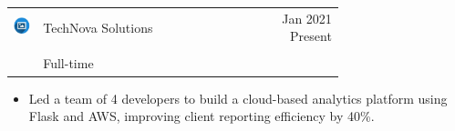 \documentclass{article}
\begin{document}
\begin{paracol}{2}
\colorbox{maincolor}{%
  \begin{minipage}{\linewidth}
    \begin{tabular}{@{}lp{0.72\linewidth}r}
      \begin{minipage}{0.05\linewidth}
        \includegraphics[width=\linewidth]{picon.png}
      \end{minipage} & 
      {{TechNova Solutions}} &  
      {\footnotesize {{Jan 2021}} {{Present}} } \\[-10pt]
      & {\color{sidetext}{Senior Software Engineer}} & \\
      & {\small {{Full-time}} } & \\
    \end{tabular}
\begin{itemize}
    \item {{Led a team of 4 developers to build a cloud-based analytics platform using Flask and AWS, improving client reporting efficiency by 40\%.}}
\end{itemize}
  \end{minipage}%
}

~ \\[-6pt]


\end{paracol}
\end{document}
